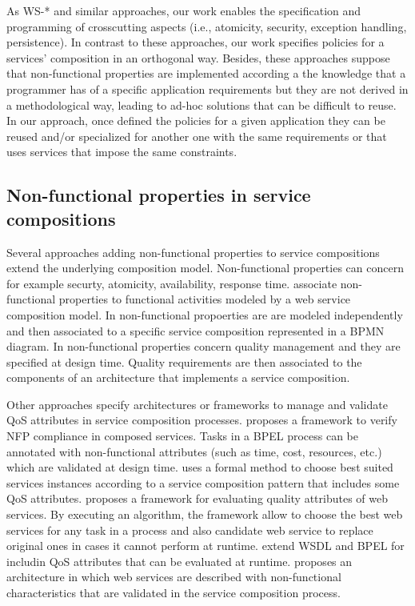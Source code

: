 As WS-* and similar approaches, our work enables the specification and programming of crosscutting aspects (i.e., atomicity, security, exception handling, persistence).
In contrast to these approaches, our work specifies policies for a services' composition in an orthogonal way. Besides, these approaches suppose that non-functional properties are implemented according a the knowledge that a programmer has of a specific application requirements but they are not derived in a methodological way, leading to ad-hoc solutions that can be difficult to reuse. In our approach, once defined the policies for a given application they can be reused and/or specialized for another one with the same requirements or that uses services that impose the same constraints.

\subsection{Non-functional properties in service compositions}

Several approaches adding non-functional properties to service compositions extend the underlying composition model. Non-functional properties can concern for example securty, atomicity, availability, response time.
\cite{CholletL09,SchmelingCM11}  associate non-functional  properties  to functional activities  modeled by a web service composition model. In \cite{chmelingCM11} 
non-functional propoerties are  are modeled independently and then associated to   a specific service composition represented in a BPMN diagram. 
In \cite{OvaskaEHPA10} non-functional properties concern  quality management and they are specified at design time. Quality requirements  are then associated to the components of an architecture that implements a service composition. 


Other approaches specify architectures or frameworks to manage and validate QoS attributes in service composition processes. 
\cite{XiaoCZBOLH08} proposes a framework to verify NFP compliance in composed services. Tasks in a BPEL process can be annotated with non-functional attributes (such as time, cost, resources, etc.) which are validated at design time. 
\cite{SchmelingCM11} uses a formal method  to choose best suited services instances according to a service composition pattern that includes some QoS attributes. 
 \cite{Babamir2010} proposes a framework for evaluating quality attributes of web services. By executing an algorithm, the framework allow to choose the best web services for any task in a process and also candidate web service to replace original ones in cases it cannot perform at runtime. \cite{DAmbrogio06,Liu20121080}  extend  WSDL and BPEL   for includin  QoS attributes that can be evaluated at runtime.
 \cite{Karunamurthy2012787} proposes an architecture in which web services are described with non-functional characteristics that are validated in the service composition process.

